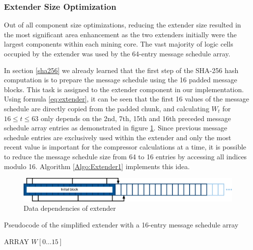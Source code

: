 \subsubsection*{Extender Size Optimization}
Out of all component size optimizations, reducing the extender size resulted in the most significant area enhancement as the two extenders initially were the largest components within each mining core. The vast majority of logic cells occupied by the extender was used by the 64-entry message schedule array.

In section \ref{sha256} we already learned that the first step of the SHA-256 hash computation is to prepare the message schedule using the 16 padded message blocks. This task is assigned to the extender component in our implementation. Using formula \ref{eq:extender}, it can be seen that the first 16 values of the message schedule are directly copied from the padded chunk, and calculating $W_t$ for $16 \leq t \leq 63$ only depends on the 2nd, 7th, 15th and 16th preceded message schedule array entries as demonstrated in figure \ref{fig:extender-dep}. Since previous message schedule entries are exclusively used within the extender and only the most recent value is important for the compressor calculations at a time, it is possible to reduce the message schedule size from 64 to 16 entries by accessing all indices modulo 16. Algorithm \ref{Algo:Extender1} implements this idea.

\begin{figure}
    \centering
    \includegraphics[width=\textwidth]{img/Extender-dep.eps}
    \caption[Data dependencies of extender]{Data dependencies of extender}
    \label{fig:extender-dep}
\end{figure}

\begin{algorithm}[H]
\caption{Pseudocode of the simplified extender with a 16-entry message schedule array}
\label{Algo:Extender1}
\begin{algorithmic}[1]
    \State ARRAY $W[0 \dots 15]$
        \Else
        \EndIf
        \State {}
    \EndFor
\end{algorithmic}
\end{algorithm}

